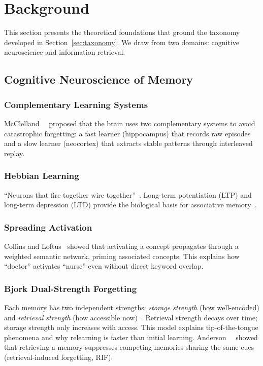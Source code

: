 \section{Background}
\label{sec:background}

This section presents the theoretical foundations that ground the
taxonomy developed in Section~\ref{sec:taxonomy}. We draw from two
domains: cognitive neuroscience and information retrieval.

\subsection{Cognitive Neuroscience of Memory}

\subsubsection{Complementary Learning Systems}
McClelland~\etal~\cite{mcclelland1995} proposed that the brain uses two
complementary systems to avoid catastrophic forgetting: a fast learner
(hippocampus) that records raw episodes and a slow learner (neocortex)
that extracts stable patterns through interleaved replay.

\subsubsection{Hebbian Learning}
``Neurons that fire together wire together''~\cite{hebb1949}. Long-term
potentiation (LTP) and long-term depression (LTD) provide the
biological basis for associative memory~\cite{bliss1973}.

\subsubsection{Spreading Activation}
Collins and Loftus~\cite{collins1975} showed that activating a concept
propagates through a weighted semantic network, priming associated
concepts. This explains how ``doctor'' activates ``nurse'' even without
direct keyword overlap.

\subsubsection{Bjork Dual-Strength Forgetting}
Each memory has two independent strengths: \emph{storage strength} (how
well-encoded) and \emph{retrieval strength} (how accessible
now)~\cite{bjork1992}. Retrieval strength decays over time; storage
strength only increases with access. This model explains tip-of-the-tongue
phenomena and why relearning is faster than initial
learning. Anderson~\etal~\cite{anderson1994} showed that retrieving a
memory suppresses competing memories sharing the same cues
(retrieval-induced forgetting, RIF).

